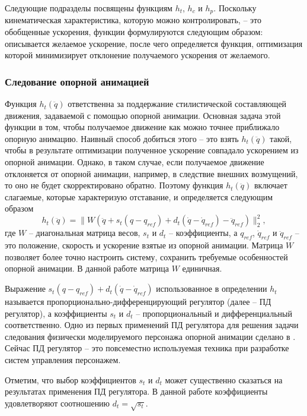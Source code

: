 Следующие подразделы посвящены функциям $h_{t}$, $h_{c}$ и $h_{p}$. Поскольку кинематическая характеристика, которую можно контролировать, -- это обобщенные ускорения, функции формулируются следующим образом: описывается желаемое ускорение, после чего определяется функция, оптимизация которой минимизирует отклонение получаемого ускорения от желаемого.

\subsubsection{Следование опорной анимацией}

Функция $h_{t}(\ddot{q})$ ответственна за поддержание стилистической составляющей движения, задаваемой с помощью опорной анимации. Основная задача этой функции в том, чтобы получаемое движение как можно точнее приближало опорную анимацию. Наивный способ добиться этого -- это взять $h_{t}(\ddot{q})$ такой, чтобы в результате оптимизации полученное ускорение совпадало ускорением из опорной анимации. Однако, в таком случае, если получаемое движение отклоняется от опорной анимации, например, в следствие внешних возмущений, то оно не будет скорректировано обратно. Поэтому функция $h_{t}(\ddot{q})$ включает слагаемые, которые характеризую отставание, и определяется следующим образом
\begin{equation*}
  h_{t}(\ddot{q}) = \lVert W (\ddot{q} + s_{t} (q - q_{ref}) + d_{t} (\dot{q} - \dot{q}_{ref}) - \ddot{q}_{ref}) \rVert_{2}^{2},
\end{equation*}
где $W$ -- диагональная матрица весов, $s_{t}$ и $d_{t}$ -- коэффициенты, а $q_{ref}$, $\dot{q}_{ref}$ и $\ddot{q}_{ref}$ -- это положение, скорость и ускорение взятые из опорной анимации. Матрица $W$ позволяет более точно настроить систему, сохранить требуемые особенностей опорной анимации. В данной работе матрица $W$ единичная.

Выражение $s_{t} (q - q_{ref}) + d_{t} (\dot{q} - \dot{q}_{ref})$ использованное в определении $h_{t}$ называется \break пропорционально-дифференцирующий регулятор (далее -- ПД регулятор), а коэффициенты $s_{t}$ и $d_{t}$ -- пропорциональный и дифференциальный соответственно. Одно из первых применений ПД регулятора для решения задачи следования физически моделируемого персонажа опорной анимации сделано в \cite{HodginsWBO}. Сейчас ПД регулятор -- это повсеместно используемая техника при разработке систем управления персонажем.

Отметим, что выбор коэффициентов $s_{t}$ и $d_{t}$ может существенно сказаться на результатах применения ПД регулятора. В данной работе коэффициенты удовлетворяют соотношению $d_{t} = \sqrt{s_{t}}$.

